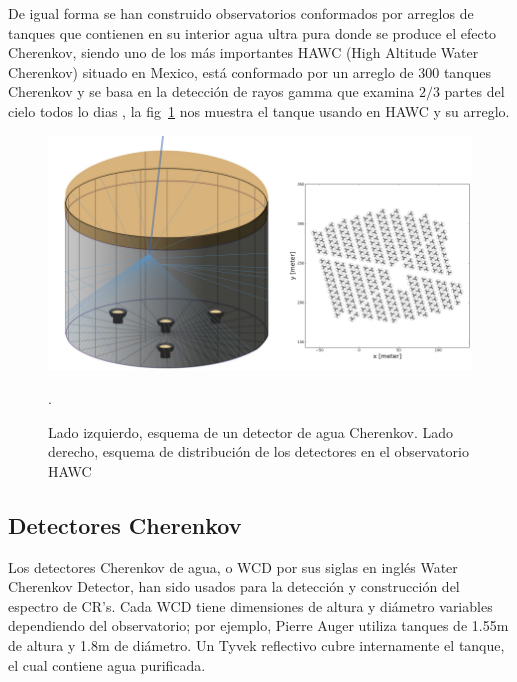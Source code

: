 	De igual forma se han construido observatorios conformados por arreglos de tanques que contienen en su interior agua ultra pura donde se produce el efecto Cherenkov, siendo uno de los más importantes HAWC (High Altitude Water Cherenkov) situado en Mexico, está conformado por un arreglo de 300 tanques Cherenkov y se basa en la detección de rayos gamma que examina $2/3$ partes del cielo todos lo dias \cite{lennarz}, la fig~\ref{TANQUE_HAWC} nos muestra el tanque usando en HAWC y su arreglo.
	
	\begin{figure}[h]
		\centering
		\includegraphics[scale = 0.3]{FIGURAS/TANQUE_HAWC.png}
		\caption{Lado izquierdo, esquema de un detector de agua Cherenkov. Lado derecho, esquema de distribución de los detectores en el observatorio HAWC \cite{Abeysekara}}.
		\label{TANQUE_HAWC}
	\end{figure}

	\subsection{Detectores Cherenkov}\label{DETECTORES_CHERENKOV}
		Los detectores Cherenkov de agua, o WCD por sus siglas en inglés Water Cherenkov Detector, han sido usados para la detección y construcción del espectro de CR's. Cada WCD tiene dimensiones de altura y diámetro variables dependiendo del observatorio; por ejemplo, Pierre Auger utiliza tanques de 1.55m de altura y 1.8m de diámetro. Un Tyvek reflectivo cubre internamente el tanque, el cual contiene agua purificada.
		
